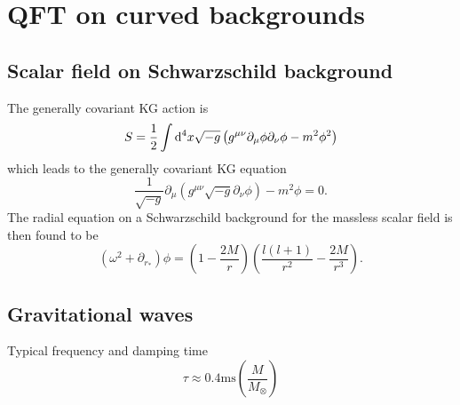 \chapter{QFT on curved backgrounds}
\section{Scalar field on Schwarzschild background}
The generally covariant KG action is
\begin{equation}
	S= \frac{1}{2} \int \mathrm{d}^4 x \sqrt{-g} \left(g^{\mu \nu} \partial_\mu \phi \partial_\nu \phi - m^2 \phi^2\right)
\end{equation}
which leads to the generally covariant KG equation
\begin{equation}
	\frac{1}{\sqrt{-g}} \partial_\mu (g^{\mu \nu} \sqrt{-g} \partial_\nu \phi) - m^2 \phi =0.
\end{equation}
The radial equation on a Schwarzschild background for the massless scalar field is then found to be
\begin{equation}
	(\omega^2+\partial_{r_*}) \phi= \left(1-\frac{2M}{r}\right) \left(\frac{l(l+1)}{r^2}-\frac{2M}{r^3}\right).
\end{equation}
\section{Gravitational waves}
Typical frequency and damping time
\begin{equation}
	\tau \approx 0.4 \mathrm{ms}\left(\frac{M}{M_\otimes}\right)
\end{equation}